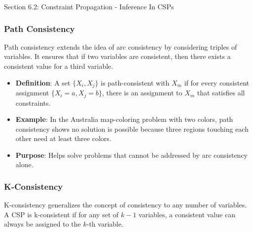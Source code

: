 \begin{notes}{Section 6.2: Constraint Propagation - Inference In CSPs}
\begin{highlight}
    \end{highlight}
    
    \subsubsection*{Path Consistency}
    
    Path consistency extends the idea of arc consistency by considering triples of variables. It ensures that if two variables are consistent, then there exists a consistent value for a third variable.
    
    \begin{highlight}
    
        \begin{itemize}
            \item \textbf{Definition}: A set $\{X_i, X_j\}$ is path-consistent with $X_m$ if for every consistent assignment $\{X_i = a, X_j = b\}$, there is an assignment to $X_m$ that satisfies all constraints.
            \item \textbf{Example}: In the Australia map-coloring problem with two colors, path consistency shows no solution is possible because three regions touching each other need at least three colors.
            \item \textbf{Purpose}: Helps solve problems that cannot be addressed by arc consistency alone.
        \end{itemize}
    
    \end{highlight}
    
    \subsubsection*{K-Consistency}
    
    K-consistency generalizes the concept of consistency to any number of variables. A CSP is k-consistent if for any set of $k-1$ variables, a consistent value can always be assigned to the $k$-th variable.
    
    \begin{highlight}[K-Consistency]
    

\end{highlight}
\end{notes}
